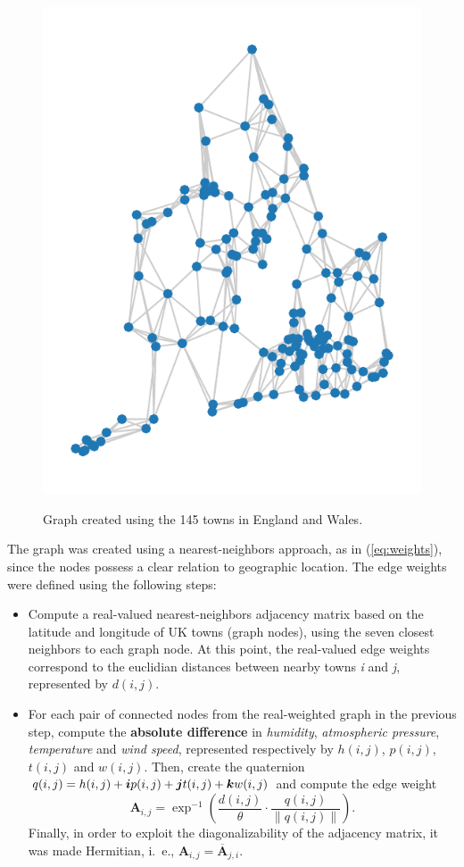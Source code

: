 \begin{figure}
    \centering
    \caption{Graph created using the 145 towns in England and Wales.}
    \includegraphics[width=0.3\linewidth]{Figures/uk_example/uk_graph.pdf}
    \floatsource
    \label{fig:uk_graph}
\end{figure}

The graph was created using a nearest-neighbors approach, as in (\ref{eq:weights}), since the nodes possess a clear relation to geographic location. The edge weights were defined using the following steps:
\begin{itemize}[noitemsep]
    \item Compute a real-valued nearest-neighbors adjacency matrix based on the latitude and longitude of UK towns (graph nodes), using the seven closest neighbors to each graph node. At this point, the real-valued edge weights correspond to the euclidian distances between nearby towns \textit{i} and \textit{j}, represented by ${d}(i, j)$.
    \item For each pair of connected nodes from the real-weighted graph in the previous step, compute the \textbf{absolute difference} in \textit{humidity}, \textit{atmospheric pressure}, \textit{temperature} and \textit{wind speed}, represented respectively by ${h}(i, j)$, $p(i, j)$, ${t}(i, j)$ and ${w}(i, j)$. Then, create the quaternion $q(i, j) = {h}(i, j) + \boldsymbol{i} {p}(i, j) + \boldsymbol{j} {t}(i, j) + \boldsymbol{k} {w}(i, j)$ and compute the edge weight
          \begin{equation}
              \label{eq:edge_weight_qgsp}
              \mathbf{A}_{i, j} = \exp^{-1} \left(
              \frac{d(i, j)}{\theta} \cdot
              \frac{q(i, j)}{\parallel q(i, j) \parallel}
              \right).
          \end{equation}
          Finally, in order to exploit the diagonalizability of the adjacency matrix, it was made Hermitian, i.~e., $\mathbf{A}_{i, j} = \overline{\mathbf{A}}_{j, i}$.
\end{itemize}

